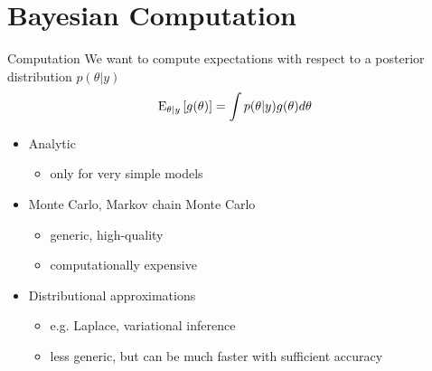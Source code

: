 \documentclass[10pt]{beamer}
\begin{document}
%


\section{Bayesian Computation}
\frame{\sectionpage}

\begin{frame}{Computation}
  We want to compute expectations with respect to a posterior
  distribution $p(\theta|y)$
  \begin{align*}
    \mathrm{E}_{\theta|y}\left[ g(\theta) \right] = \int p(\theta|y)g(\theta) d\theta
  \end{align*}

  \begin{itemize}
  \item Analytic
    \begin{itemize}
    \item only for very simple models
    \end{itemize}
  \item Monte Carlo, Markov chain Monte Carlo
    \begin{itemize}
    \item generic, high-quality
    \item computationally expensive
    \end{itemize}
  \item Distributional approximations
    \begin{itemize}
    \item e.g. Laplace, variational inference
    \item less generic, but can be much faster with sufficient accuracy
    \end{itemize}
  \end{itemize}
\end{frame}
\end{document}
